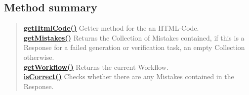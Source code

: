 \documentclass[11pt,a4paper]{report}
\begin{document}
{{{{{{{			\subsection{Method summary}{
				\begin{verse}
					\hyperlink{studyplanning.controller.Response.getHtmlCode()}{{\bf getHtmlCode()}} Getter method for the an HTML-Code.\\
					\hyperlink{studyplanning.controller.Response.getMistakes()}{{\bf getMistakes()}} Returns the Collection of Mistakes contained, if this is a Response for a failed generation or verification task, an empty Collection otherwise.\\
					\hyperlink{studyplanning.controller.Response.getWorkflow()}{{\bf getWorkflow()}} Returns the current Workflow.\\
					\hyperlink{studyplanning.controller.Response.isCorrect()}{{\bf isCorrect()}} Checks whether there are any Mistakes contained in the Response.\\
				\end{verse}
			}

}}}}}}}
\end{document}
